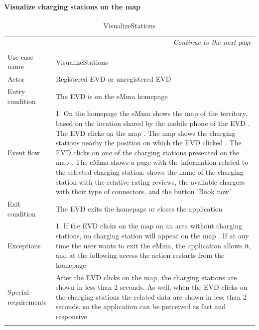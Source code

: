 \paragraph{Visualize charging stations on the map}
\begin{center}
    \begin{longtable}{p{4cm} p{11cm}}
    \multicolumn{2}{r}{\itshape{Continue to the next page}}\\
    \endfoot 
    \\
    \endlastfoot
    \hline
     Use case name &  VisualizeStations\\
     \hline
     Actor & Registered EVD or unregistered EVD \\
     \hline
     Entry condition & The EVD is on the eMma homepage \\
     \hline
     Event flow &   1. On the homepage the eMma shows the map of the territory, based on the location shared by the mobile phone of the EVD \newline
                    2. The EVD clicks on the map \newline
                    3. The map shows the charging stations nearby the position on which the EVD clicked \newline
                    4. The EVD clicks on one of the charging stations presented on the map \newline
                    5. The eMma shows a page with the information related to the selected charging station: shows the name of the charging station with the relative rating reviews, the available chargers with their type of connectors, and the button 'Book now'\\
     \hline
     Exit condition & The EVD exits the homepage or closes the application \\
     \hline
     Exceptions &   1. If the EVD clicks on the map on an area without charging stations, no charging station will appear on the map \newline
                    2. If at any time the user wants to exit the eMma, the application allows it, and at the following access the action restarts from the homepage \\
     \hline
     Special requirements & After the EVD clicks on the map, the charging stations are shown in less than 2 seconds. As well, when the EVD clicks on the charging stations the related data are shown in less than 2 seconds, so the application can be perceived as fast and responsive \\
     \hline
    \caption{VisualizeStations}
    \label{tab:VisualizeStations}
    \end{longtable}
\end{center}

